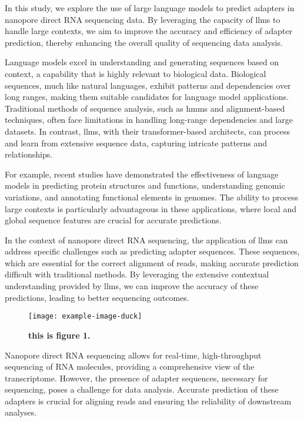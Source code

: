 \documentclass[pdflatex, sn-mathphys-num, lineno]{sn-jnl}%
\theoremstyle{thmstyleone}%
\theoremstyle{thmstyletwo}%
\theoremstyle{thmstylethree}%
\begin{document}
In this study, we explore the use of large language models to predict adapters in nanopore direct RNA sequencing data.
By leveraging the capacity of \glspl{llm} to handle large contexts, we aim to improve the accuracy and efficiency of adapter prediction, thereby enhancing the overall quality of sequencing data analysis.


Language models excel in understanding and generating sequences based on context, a capability that is highly relevant to biological data.
Biological sequences, much like natural languages, exhibit patterns and dependencies over long ranges, making them suitable candidates for language model applications.
Traditional methods of sequence analysis, such as \glspl{hmm} and alignment-based techniques, often face limitations in handling long-range dependencies and large datasets.
In contrast, \glspl{llm}, with their transformer-based architects, can process and learn from extensive sequence data, capturing intricate patterns and relationships.

For example, recent studies have demonstrated the effectiveness of language models in predicting protein structures and functions, understanding genomic variations, and annotating functional elements in genomes.
The ability to process large contexts is particularly advantageous in these applications, where local and global sequence features are crucial for accurate predictions.

In the context of nanopore direct RNA sequencing, the application of \glspl{llm} can address specific challenges such as predicting adapter sequences.
These sequences, which are essential for the correct alignment of reads, making accurate prediction difficult with traditional methods.
By leveraging the extensive contextual understanding provided by \glspl{llm}, we can improve the accuracy of these predictions, leading to better sequencing outcomes.


\begin{figure}[!h]
	\texttt{[image: example-image-duck]}
	\caption{\bf this is figure 1.}
	\label{fig:f1}
\end{figure}



Nanopore direct RNA sequencing allows for real-time, high-throughput sequencing of RNA molecules, providing a comprehensive view of the transcriptome.
However, the presence of adapter sequences, necessary for sequencing, poses a challenge for data analysis.
Accurate prediction of these adapters is crucial for aligning reads and ensuring the reliability of downstream analyses.
\end{document}
